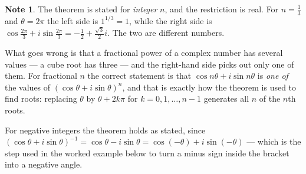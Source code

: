 \documentclass[11pt,a4paper]{article}
\theoremstyle{definition}
\newtheorem{note}[thm]{Note}
\begin{document}
\begin{note}
The theorem is stated for \emph{integer} $n$, and the restriction is real. For
$n=\frac{1}{3}$ and $\theta=2\pi$ the left side is $1^{1/3}=1$, while the right
side is $\cos\frac{2\pi}{3}+i\sin\frac{2\pi}{3}=-\frac{1}{2}+\frac{\sqrt{3}}{2}i$.
The two are different numbers.

What goes wrong is that a fractional power of a complex number has several values
--- a cube root has three --- and the right-hand side picks out only one of them. For
fractional $n$ the correct statement is that $\cos n\theta+i\sin n\theta$ is
\emph{one of} the values of $(\cos\theta+i\sin\theta)^{n}$, and that is exactly how
the theorem is used to find roots: replacing $\theta$ by $\theta+2k\pi$ for
$k=0,1,\dots,n-1$ generates all $n$ of the $n$th roots.

For negative integers the theorem holds as stated, since
$(\cos\theta+i\sin\theta)^{-1}=\cos\theta-i\sin\theta=\cos(-\theta)+i\sin(-\theta)$
--- which is the step used in the worked example below to turn a minus sign inside
the bracket into a negative angle.
\end{note}
\end{document}
